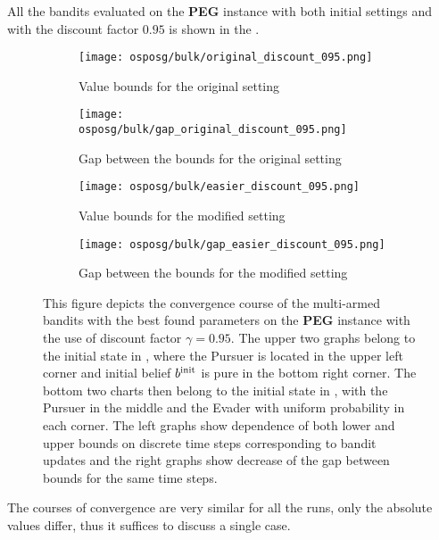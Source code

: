 \documentclass[../main.tex]{subfiles}
\begin{document}
All the bandits evaluated on the \textbf{PEG} instance with both initial settings and with the discount factor $0.95$ is shown in the .
\begin{figure}[ht]
    \begin{subfigure}[t]{0.45\linewidth}
        \texttt{[image: osposg/bulk/original\_discount\_095.png]}
        \caption{Value bounds for the original setting }
        \label{exp:osposg:bulk:fig:original:bounds}
    \end{subfigure}
    \hfill
    \begin{subfigure}[t]{0.45\linewidth}
        \texttt{[image: osposg/bulk/gap\_original\_discount\_095.png]}
        \caption{Gap between the bounds for the original setting }
        \label{exp:osposg:bulk:fig:original:gap}
    \end{subfigure}
    \begin{subfigure}[t]{0.45\linewidth}
        \texttt{[image: osposg/bulk/easier\_discount\_095.png]}
        \caption{Value bounds for the modified setting }
        \label{exp:osposg:bulk:fig:easier:bounds}
    \end{subfigure}
    \hfill
    \begin{subfigure}[t]{0.45\linewidth}
        \texttt{[image: osposg/bulk/gap\_easier\_discount\_095.png]}
        \caption{Gap between the bounds for the modified setting }
        \label{exp:osposg:bulk:fig:easier:gap}
    \end{subfigure}
    \caption[Comparison of the multi-armed bandits on the \textbf{PEG} instance]{
        This figure depicts the convergence course of the multi-armed bandits with the best found parameters on the \textbf{PEG} instance with the use of discount factor $\gamma = 0.95$.
        The upper two graphs belong to the initial state in , where the Pursuer is located in the upper left corner and initial belief $b^{\text{init}}$ is pure in the bottom right corner.
        The bottom two charts then belong to the initial state in , with the Pursuer in the middle and the Evader with uniform probability in each corner.
        The left graphs show dependence of both lower and upper bounds on discrete time steps corresponding to bandit updates and the right graphs show decrease of the gap between bounds for the same time steps.
    }
    \label{exp:osposg:bulk:fig}
\end{figure}
The courses of convergence are very similar for all the runs, only the absolute values differ, thus it suffices to discuss a single case.
\end{document}
